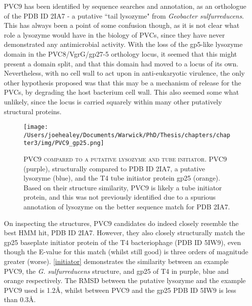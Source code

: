 PVC9 has been identified by sequence searches and annotation, as an orthologue of the PDB ID 2IA7 - a putative ``tail lysozyme" from \emph{Geobacter sulfurreducens}. This has always been a point of some confusion though, as it is not clear what role a lysozyme would have in the biology of PVCs, since they have never demonstrated any antimicrobial activity. With the loss of the gp5-like lysozyme domain in the PVC8/VgrG/gp27-5 orthology locus, it seemed that this might present a domain split, and that this domain had moved to a locus of its own. Nevertheless, with no cell wall to act upon in anti-eukaryotic virulence, the only other hypothesis proposed was that this may be a mechanism of release for the PVCs, by degrading the host bacterium cell wall. This also seemed some what unlikely, since the locus is carried squarely within many other putatively structural proteins.

\begin{figure}[h]
\thispagestyle{IHA-fancy-style}
\centering
\texttt{[image: /Users/joehealey/Documents/Warwick/PhD/Thesis/chapters/chapter3/img/PVC9\_gp25.png]}
\captionsetup{singlelinecheck=off, justification=justified, font=footnotesize, aboveskip=10pt}
\caption[PVC9 as a tube initiator candidate]{\textsc{\normalsize PVC9 compared to a putative lysozyme and tube initiator.}\vspace{0.1cm} \newline PVC9 (purple), structurally compared to PDB ID 2IA7, a putative lysozyme (blue), and the T4 tube initiator protein gp25 (orange). Based on their structure similarity, PVC9 is likely a tube initiator protein, and this was not previously identified due to a spurious annotation of lysozyme on the better sequence match for PDB 2IA7.}
	\label{initiator}
\end{figure}


On inspecting the structures, PVC9 candidates do indeed closely resemble the best HMM hit, PDB ID 2IA7. However, they also closely structurally match the gp25 baseplate initiator protein of the T4 bacteriophage (PDB ID 5IW9), even though the E-value for this match (whilst still good) is three orders of magnitude greater (worse). \vref{initiator} demonstrates the similarity between an example PVC9, the \emph{G. sulfurreducens} structure, and gp25 of T4 in purple, blue and orange respectively. The RMSD between the putative lysozyme and the example PVC9 used is 1.2\AA, whilst between PVC9 and the gp25 PDB ID 5IW9 is less than 0.3\AA.


